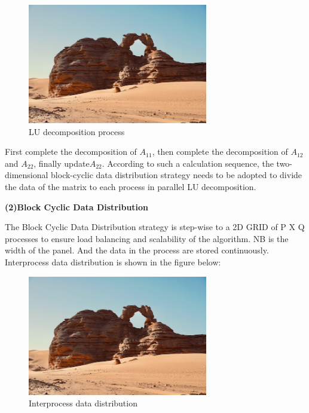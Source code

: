 \documentclass[a4paper,12pt]{article}
\begin{document}
\begin{figure}[H]
    \centering
    \includegraphics[width=0.7\textwidth]{LU_decomposition_process.png}
    \caption{LU decomposition process}
    \label{fig:lu_decomposition}
\end{figure}

First complete the decomposition of $A_{11}$, then complete the decomposition of $A_{12}$and $A_{22}$, finally update$A_{22}$. According to such a calculation sequence, the two-dimensional block-cyclic data distribution strategy needs to be adopted to divide the data of the matrix to each process in parallel LU decomposition.

\textbf{(2)Block Cyclic Data Distribution}

The Block Cyclic Data Distribution strategy is step-wise to a 2D GRID of P X Q processes to ensure load balancing and scalability of the algorithm. NB is the width of the panel. And the data in the process are stored continuously. Interprocess data distribution is shown in the figure below:

\begin{figure}[H]
    \centering
    \includegraphics[width=0.7\textwidth]{Interprocess_data_distribution.png}
    \caption{Interprocess data distribution}
    \label{fig:interprocess_data}
\end{figure}
\end{document}
